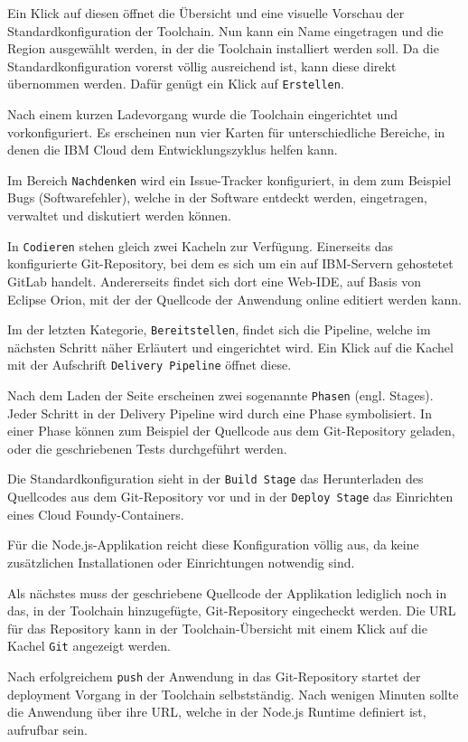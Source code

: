 Ein Klick auf diesen öffnet die Übersicht und eine visuelle Vorschau der Standardkonfiguration der Toolchain. Nun kann ein
Name eingetragen und die Region ausgewählt werden, in der die Toolchain installiert werden soll. Da die Standardkonfiguration
vorerst völlig ausreichend ist, kann diese direkt übernommen werden. Dafür genügt ein Klick auf \texttt{Erstellen}.

Nach einem kurzen Ladevorgang wurde die Toolchain eingerichtet und vorkonfiguriert. Es erscheinen nun vier Karten für
unterschiedliche Bereiche, in denen die IBM Cloud dem Entwicklungszyklus helfen kann.

Im Bereich \texttt{Nachdenken} wird ein Issue-Tracker konfiguriert, in dem zum Beispiel Bugs (Softwarefehler), welche
in der Software entdeckt werden, eingetragen, verwaltet und diskutiert werden können.

In \texttt{Codieren} stehen gleich zwei Kacheln zur Verfügung. Einerseits das konfigurierte Git-Repository, bei dem es
sich um ein auf IBM-Servern gehostetet GitLab handelt. Andererseits findet sich dort eine Web-IDE, auf Basis von Eclipse
Orion, mit der der Quellcode der Anwendung online editiert werden kann.

Im der letzten Kategorie, \texttt{Bereitstellen}, findet sich die Pipeline, welche im nächsten Schritt näher Erläutert
und eingerichtet wird. Ein Klick auf die Kachel mit der Aufschrift \texttt{Delivery Pipeline} öffnet diese.

Nach dem Laden der Seite erscheinen zwei sogenannte \texttt{Phasen} (engl. Stages). Jeder Schritt in der Delivery Pipeline
wird durch eine Phase symbolisiert. In einer Phase können zum Beispiel der Quellcode aus dem Git-Repository geladen, oder
die geschriebenen Tests durchgeführt werden.

Die Standardkonfiguration sieht in der \texttt{Build Stage} das Herunterladen des Quellcodes aus dem Git-Repository vor
und in der \texttt{Deploy Stage} das Einrichten eines Cloud Foundy-Containers.

Für die Node.js-Applikation reicht diese Konfiguration völlig aus, da keine zusätzlichen Installationen oder Einrichtungen
notwendig sind.

Als nächstes muss der geschriebene Quellcode der Applikation lediglich noch in das, in der Toolchain hinzugefügte,
Git-Repository eingecheckt werden. Die URL für das Repository kann in der Toolchain-Übersicht mit einem Klick auf die
Kachel \texttt{Git} angezeigt werden.

Nach erfolgreichem \texttt{push} der Anwendung in das Git-Repository startet der deployment Vorgang in der Toolchain
selbstständig. Nach wenigen Minuten sollte die Anwendung über ihre URL, welche in der Node.js Runtime definiert ist,
aufrufbar sein.

